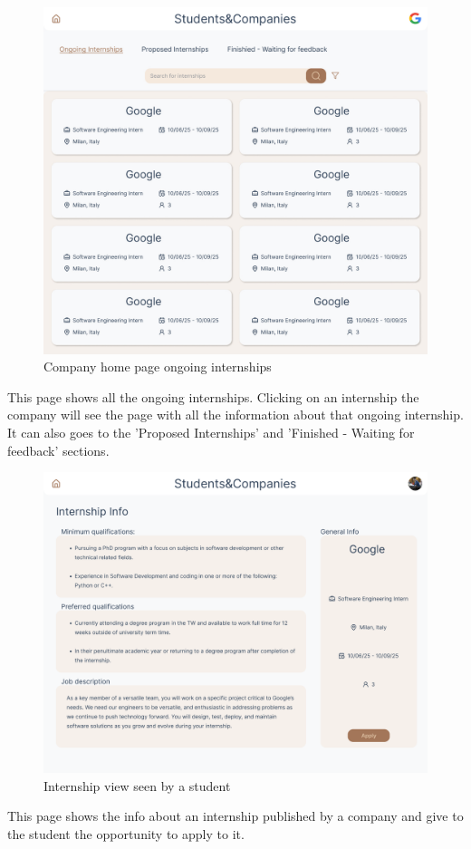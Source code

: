 \documentclass{article}
\begin{document}
\begin{figure}[H]
    \centering
    \includegraphics[width=1\linewidth]{interface/HomePage-Company.jpg}
    \caption{Company home page ongoing internships}
    \label{fig:enter-label}
\end{figure}
This page shows all the ongoing internships. Clicking on an internship the company will see the page with all the information about that ongoing internship. It can also goes to the 'Proposed Internships' and 'Finished - Waiting for feedback' sections. 

\begin{figure}[H]
    \centering
    \includegraphics[width=1\linewidth]{interface/Internship view - Student.png}
    \caption{Internship view seen by a student}
    \label{fig:enter-label}
\end{figure}
This page shows the info about an internship published by a company and give to the student the opportunity to apply to it. 
\end{document}
